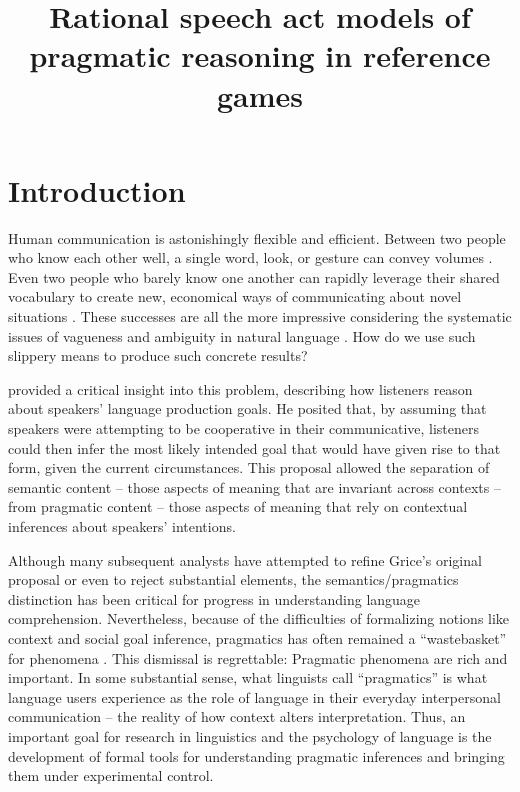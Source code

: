 \documentclass[man,noapacite]{apa2}
\title{\vspace{-2ex} Rational speech act models of pragmatic reasoning in reference games}
\begin{document}
\maketitle

\section{Introduction}

Human communication is astonishingly flexible and efficient. Between two people who know each other well, a single word, look, or gesture can convey volumes \cite{sperber1986,clark1996}. Even two people who barely know one another can rapidly leverage their shared vocabulary to create new, economical ways of communicating about novel situations \cite{brennan1996,clark1991}. These successes are all the more impressive considering the systematic issues of vagueness and ambiguity in natural language \cite{keefe1997,wasow2005}. How do we use such slippery means to produce such concrete results?

 provided a critical insight into this problem, describing how listeners reason about speakers' language production goals. He posited that, by assuming that speakers were attempting to be cooperative in their communicative, listeners could then infer the most likely intended goal that would have given rise to that form, given the current circumstances. This proposal allowed the separation of semantic content -- those aspects of meaning that are invariant across contexts -- from pragmatic content -- those aspects of meaning that rely on contextual inferences about speakers' intentions.

Although many subsequent analysts have attempted to refine Grice's original proposal or even to reject substantial elements, the semantics/pragmatics distinction has been critical for progress in understanding language comprehension. Nevertheless, because of the difficulties of formalizing notions like context and social goal inference, pragmatics has often remained a ``wastebasket'' for phenomena \cite{bar-hillel1971}. This dismissal is regrettable: Pragmatic phenomena are rich and important. In some substantial sense, what linguists call ``pragmatics'' is what language users experience as the role of language in their everyday interpersonal communication -- the reality of how context alters interpretation. Thus, an important goal for research in linguistics and the psychology of language is the development of formal tools for understanding pragmatic inferences and bringing them under experimental control.
\end{document}
